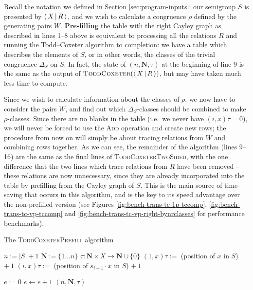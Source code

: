 Recall the notation we defined in Section \ref{sec:program-inputs}: our
semigroup $S$ is presented by $\left\langle \, X \, \middle| \, R \, \right\rangle$, and we wish to calculate a congruence
$\rho$ defined by the generating pairs $W$.  \textbf{Pre-filling} the table with the
right Cayley graph as described in lines 1--8 above is equivalent to processing all the
relations $R$ and running the Todd--Coxeter algorithm to completion: we have a table which
describes the elements of $S$, or in other words, the classes of the trivial
congruence $\Delta_S$ on $S$.  In fact, the state of $(n, \mathbf{N}, \tau)$ at
the beginning of line 9 is the same as the output of
$\textsc{ToddCoxeter}(\left\langle \, X \, \middle| \, R \, \right\rangle)$, but may have taken much less time to compute.

Since we wish to calculate information about the classes of $\rho$, we now
have to consider the pairs $W$, and find out which $\Delta_S$-classes should be
combined to make $\rho$-classes.  Since there are no blanks in the table (i.e.~we never have
$(i,x)\tau=0$), we will never be forced to use the \textsc{Add} operation and
create new rows; the procedure from now on will simply be about tracing
relations from $W$ and combining rows together.  As we can see, the remainder of
the algorithm (lines 9--16) are the same as the final lines of
\textsc{ToddCoxeterTwoSided}, with the one difference that the two lines which
trace relations from $R$ have been removed -- these relations are now
unnecessary, since they are already incorporated into the table by prefilling
from the Cayley graph of $S$.  This is the main source of time-saving that
occurs in this algorithm, and is the key to its speed advantage over the
non-prefilled version (see Figures
\ref{fig:bench-trans-tc-1p-tccomp},
\ref{fig:bench-trans-tc-vp-tccomp} and
\ref{fig:bench-trans-tc-vp-right-bynrclasses} for performance benchmarks).

\begin{algorithm}
\caption{The \textsc{ToddCoxeterPrefill} algorithm}
\label{alg:tc-prefill}
\begin{algorithmic}[1]
\State $n := |S| + 1$
\State $\mathbf{N} := \{1 \ldots n\}$
\State $\tau : \mathbf{N} \times X \to \mathbf{N} \cup \{0\}$
  \State $(1, x)\tau :=$ (position of $x$ in $S$) $+~1$
    \State $(i, x)\tau :=$ (position of $s_{i-1} \cdot x$ in $S$) $+~1$
  \EndFor
\EndFor

\State $e := 0$
\Repeat
  \State $e \gets e + 1$
      \State {}
    \EndFor
  \EndIf
{}  
\State \Return $(n, \mathbf{N}, \tau)$

\EndProcedure
\end{algorithmic}
\end{algorithm}

